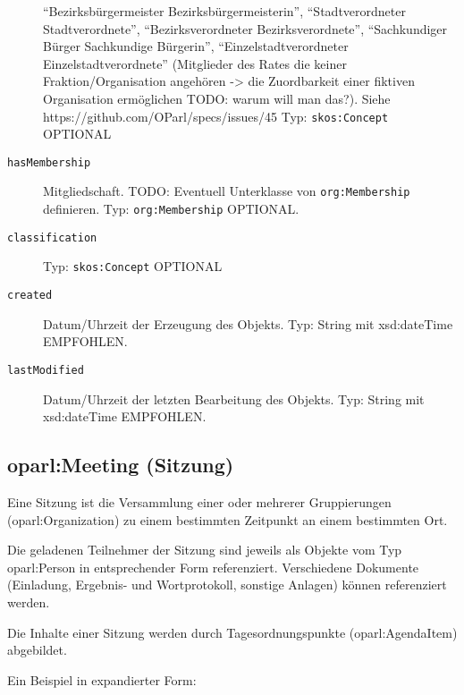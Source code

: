 \documentclass[,a4paper]{article}
\begin{document}
\begin{description}
``Bezirksbürgermeister \textbar{} Bezirksbürgermeisterin'',
``Stadtverordneter \textbar{} Stadtverordnete'', ``Bezirksverordneter
\textbar{} Bezirksverordnete'', ``Sachkundiger Bürger \textbar{}
Sachkundige Bürgerin'', ``Einzelstadtverordneter \textbar{}
Einzelstadtverordnete'' (Mitglieder des Rates die keiner
Fraktion/Organisation angehören -\textgreater{} die Zuordbarkeit einer
fiktiven Organisation ermöglichen TODO: warum will man das?). Siehe
https://github.com/OParl/specs/issues/45 Typ: \texttt{skos:Concept}
OPTIONAL
\item[\texttt{hasMembership}]
Mitgliedschaft. TODO: Eventuell Unterklasse von \texttt{org:Membership}
definieren. Typ: \texttt{org:Membership} OPTIONAL.
\item[\texttt{classification}]
Typ: \texttt{skos:Concept} OPTIONAL
\item[\texttt{created}]
Datum/Uhrzeit der Erzeugung des Objekts. Typ: String mit xsd:dateTime
EMPFOHLEN.
\item[\texttt{lastModified}]
Datum/Uhrzeit der letzten Bearbeitung des Objekts. Typ: String mit
xsd:dateTime EMPFOHLEN.
\end{description}

\subsection{oparl:Meeting (Sitzung)}\label{oparlux5fmeeting}

Eine Sitzung ist die Versammlung einer oder mehrerer Gruppierungen
(oparl:Organization) zu einem bestimmten Zeitpunkt an einem bestimmten
Ort.

Die geladenen Teilnehmer der Sitzung sind jeweils als Objekte vom Typ
oparl:Person in entsprechender Form referenziert. Verschiedene Dokumente
(Einladung, Ergebnis- und Wortprotokoll, sonstige Anlagen) können
referenziert werden.

Die Inhalte einer Sitzung werden durch Tagesordnungspunkte
(oparl:AgendaItem) abgebildet.

Ein Beispiel in expandierter Form:
\end{document}
